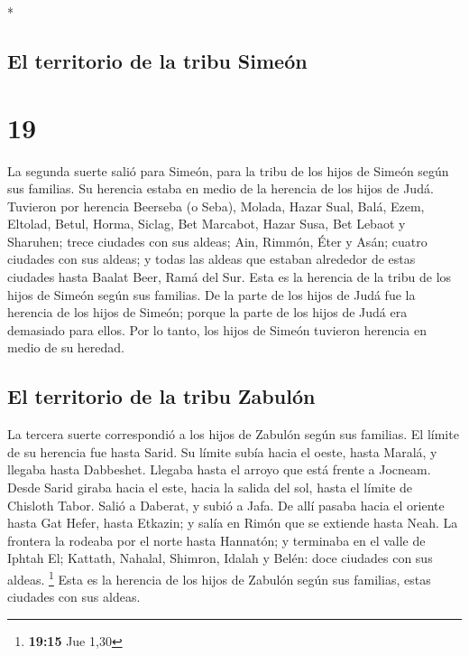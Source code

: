 \begin{paracol}{2}
\begin{otherlanguage}{english}
\end{otherlanguage}

\switchcolumn[0]*

\hypertarget{el-territorio-de-la-tribu-simeuxf3n}{%
\subsection{El territorio de la tribu
Simeón}\label{el-territorio-de-la-tribu-simeuxf3n}}

\hypertarget{section-36}{%
\section{19}\label{section-36}}

 La segunda suerte salió para Simeón, para la tribu de los
hijos de Simeón según sus familias. Su herencia estaba en medio de la
herencia de los hijos de Judá.  Tuvieron por herencia
Beerseba (o Seba), Molada,  Hazar Sual, Balá, Ezem,
 Eltolad, Betul, Horma,  Siclag, Bet
Marcabot, Hazar Susa,  Bet Lebaot y Sharuhen; trece
ciudades con sus aldeas;  Ain, Rimmón, Éter y Asán; cuatro
ciudades con sus aldeas;  y todas las aldeas que estaban
alrededor de estas ciudades hasta Baalat Beer, Ramá del Sur. Esta es la
herencia de la tribu de los hijos de Simeón según sus familias.
 De la parte de los hijos de Judá fue la herencia de los
hijos de Simeón; porque la parte de los hijos de Judá era demasiado para
ellos. Por lo tanto, los hijos de Simeón tuvieron herencia en medio de
su heredad.

\hypertarget{el-territorio-de-la-tribu-zabuluxf3n}{%
\subsection{El territorio de la tribu
Zabulón}\label{el-territorio-de-la-tribu-zabuluxf3n}}

 La tercera suerte correspondió a los hijos de Zabulón
según sus familias. El límite de su herencia fue hasta Sarid.
 Su límite subía hacia el oeste, hasta Maralá, y llegaba
hasta Dabbeshet. Llegaba hasta el arroyo que está frente a Jocneam.
 Desde Sarid giraba hacia el este, hacia la salida del
sol, hasta el límite de Chisloth Tabor. Salió a Daberat, y subió a Jafa.
 De allí pasaba hacia el oriente hasta Gat Hefer, hasta
Etkazin; y salía en Rimón que se extiende hasta Neah.  La
frontera la rodeaba por el norte hasta Hannatón; y terminaba en el valle
de Iphtah El;  Kattath, Nahalal, Shimron, Idalah y Belén:
doce ciudades con sus aldeas. \footnote{\textbf{19:15} Jue 1,30}
 Esta es la herencia de los hijos de Zabulón según sus
familias, estas ciudades con sus aldeas.


\end{paracol}
